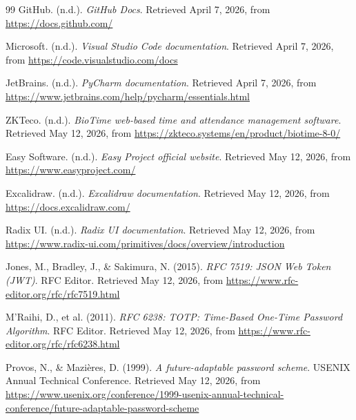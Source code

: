 \begin{thebibliography}{99}
	GitHub. (n.d.). \textit{GitHub Docs}. Retrieved April 7, 2026, from \url{https://docs.github.com/}
	
	Microsoft. (n.d.). \textit{Visual Studio Code documentation}. Retrieved April 7, 2026, from \url{https://code.visualstudio.com/docs}
	
	JetBrains. (n.d.). \textit{PyCharm documentation}. Retrieved April 7, 2026, from \url{https://www.jetbrains.com/help/pycharm/essentials.html}
	
	
	ZKTeco. (n.d.). \textit{BioTime web-based time and attendance management software}. Retrieved May 12, 2026, from \url{https://zkteco.systems/en/product/biotime-8-0/}
	
	Easy Software. (n.d.). \textit{Easy Project official website}. Retrieved May 12, 2026, from \url{https://www.easyproject.com/}
	
	Excalidraw. (n.d.). \textit{Excalidraw documentation}. Retrieved May 12, 2026, from \url{https://docs.excalidraw.com/}
	
	Radix UI. (n.d.). \textit{Radix UI documentation}. Retrieved May 12, 2026, from \url{https://www.radix-ui.com/primitives/docs/overview/introduction}
	
	Jones, M., Bradley, J., \& Sakimura, N. (2015). \textit{RFC 7519: JSON Web Token (JWT)}. RFC Editor. Retrieved May 12, 2026, from \url{https://www.rfc-editor.org/rfc/rfc7519.html}
	
	M'Raihi, D., et al. (2011). \textit{RFC 6238: TOTP: Time-Based One-Time Password Algorithm}. RFC Editor. Retrieved May 12, 2026, from \url{https://www.rfc-editor.org/rfc/rfc6238.html}
	
	Provos, N., \& Mazi\`eres, D. (1999). \textit{A future-adaptable password scheme}. USENIX Annual Technical Conference. Retrieved May 12, 2026, from \url{https://www.usenix.org/conference/1999-usenix-annual-technical-conference/future-adaptable-password-scheme}
	
	
\end{thebibliography}

\appendix